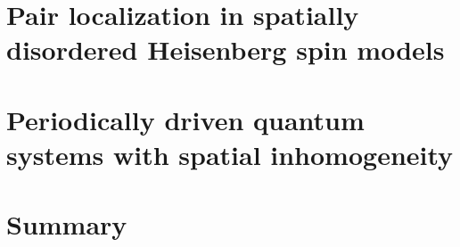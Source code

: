\documentclass[ twoside,openright,titlepage,numbers=noenddot,%
                headinclude,footinclude,cleardoublepage=empty,abstract=on,
                BCOR=5mm,paper=a4,fontsize=11pt]{scrreprt}
\begin{document}
\frenchspacing
\raggedbottom
{} %
\pagestyle{plain}



\cleardoublepage
\cleardoublepage
\cleardoublepage
\cleardoublepage

\cleardoublepage
\pagestyle{scrheadings}
\cleardoublepage



\part{Pair localization in spatially disordered Heisenberg spin models}\label{pt:spatial-disorder}









\part{Periodically driven quantum systems with spatial inhomogeneity}\label{pt:floquet}







\part{Summary}


% 
\cleardoublepage
\cleardoublepage
\end{document}
